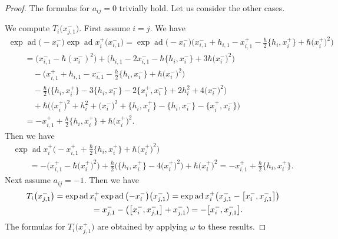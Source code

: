 \documentclass[pdftex]{sigma}
\theoremstyle{definition}
\numberwithin{equation}{section}
\DeclareMathOperator{\ad}{ad}
\begin{document}
\begin{proof}The formulas for $a_{ij}=0$ trivially hold. Let us consider the other cases.

We compute $T_i\big(x_{j,1}^-\big)$. First assume $i=j$. We have
\begin{gather*}
\exp\ad \big({-}x_i^-\big)\exp\ad x_i^+\big(x_{i,1}^-\big) = \exp\ad \big({-}x_i^-\big)\big(x_{i,1}^- + h_{i,1}-x_{i,1}^+ -\tfrac{\hbar}{2}\big\{ h_i, x_i^+\big\} + \hbar \big(x_i^+\big)^2\big)\\
\qquad {}= \big(x_{i,1}^- - \hbar(x_i^-)^2\big)+\big(h_{i,1}-2x_{i,1}^- - \hbar\big\{ h_i, x_i^- \big\} + 3\hbar \big(x_i^-\big)^2\big)\\
\qquad\quad{}-\big(x_{i,1}^+ + h_{i,1}-x_{i,1}^--\tfrac{\hbar}{2}\big\{ h_i, x_i^-\big\} + \hbar \big(x_i^-\big)^2\big)\\
\qquad\quad{}-\tfrac{\hbar}{2}\big(\big\{h_i,x_i^+\big\} - 3\big\{h_i,x_i^-\big\} - 2\big\{x_i^+,x_i^-\big\} + 2h_i^2 + 4\big(x_i^-\big)^2\big)\\
\qquad\quad{} +\hbar\big(\big(x_i^+\big)^2 + h_i^2 + \big(x_i^-\big)^2+ \big\{h_i,x_i^+\big\} - \big\{h_i,x_i^-\big\} - \big\{x_i^+,x_i^-\big\}\big)\\
\qquad{}=-x_{i,1}^+ + \tfrac{\hbar}{2}\big\{h_i,x_i^+\big\} +\hbar \big(x_i^+\big)^2.
\end{gather*}
Then we have
\begin{gather*}
\exp\ad x_i^+\big({-}x_{i,1}^+ + \tfrac{\hbar}{2}\big\{h_i,x_i^+\big\} +\hbar \big(x_i^+\big)^2\big) \\
\qquad {}= -\big( x_{i,1}^+-\hbar \big(x_i^+\big)^2 \big) + \tfrac{\hbar}{2}\big( \big\{h_i,x_i^+\big\} - 4\big(x_i^+\big)^2 \big) + \hbar \big(x_i^+\big)^2
 =-x_{i,1}^++\tfrac{\hbar}{2}\big\{h_i,x_i^+\big\}.
\end{gather*}
Next assume $a_{ij}=-1$. Then we have
\begin{gather*}
T_i\big(x_{j,1}^-\big)=\exp\ad x_i^+\exp\ad \big({-}x_i^-\big)\big(x_{j,1}^-\big) = \exp\ad x_i^+\big(x_{j,1}^- - \big[x_i^-,x_{j,1}^-\big]\big)\\
\hphantom{T_i\big(x_{j,1}^-\big)}{} = x_{j,1}^- - \big(\big[x_i^-,x_{j,1}^-\big]+x_{j,1}^-)=-\big[x_i^-,x_{j,1}^-\big]. %
\end{gather*}
The formulas for $T_i\big(x_{j,1}^+\big)$ are obtained by applying $\omega$ to these results.


\end{proof}
\end{document}
